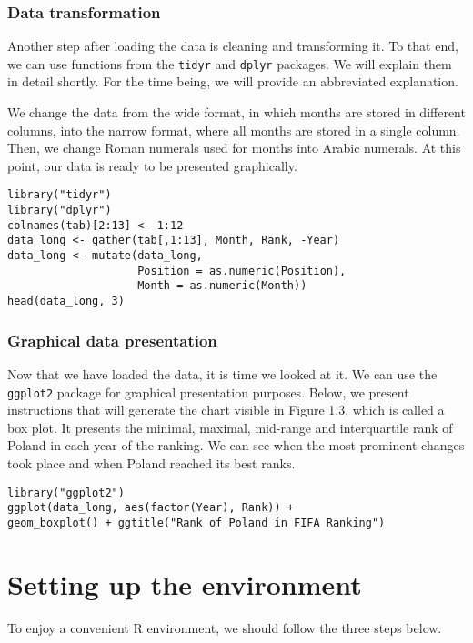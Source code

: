 \documentclass[]{book}
\theoremstyle{definition}
\theoremstyle{definition}
\theoremstyle{definition}
\theoremstyle{remark}
\begin{document}
\subsubsection{Data transformation}\label{part_1212}

Another step after loading the data is cleaning and transforming it. To
that end, we can use functions from the \texttt{tidyr} and
\texttt{dplyr} packages. We will explain them in detail shortly. For the
time being, we will provide an abbreviated explanation.

We change the data from the wide format, in which months are stored in
different columns, into the narrow format, where all months are stored
in a single column. Then, we change Roman numerals used for months into
Arabic numerals. At this point, our data is ready to be presented
graphically.

\begin{verbatim}
library("tidyr")
library("dplyr")
colnames(tab)[2:13] <- 1:12
data_long <- gather(tab[,1:13], Month, Rank, -Year)
data_long <- mutate(data_long,
                    Position = as.numeric(Position),
                    Month = as.numeric(Month))
head(data_long, 3)
\end{verbatim}

\subsubsection{Graphical data presentation}\label{part_1213}

Now that we have loaded the data, it is time we looked at it. We can use
the \texttt{ggplot2} package for graphical presentation purposes. Below,
we present instructions that will generate the chart visible in Figure
1.3, which is called a box plot. It presents the minimal, maximal,
mid-range and interquartile rank of Poland in each year of the ranking.
We can see when the most prominent changes took place and when Poland
reached its best ranks.

\begin{verbatim}
library("ggplot2")
ggplot(data_long, aes(factor(Year), Rank)) +
geom_boxplot() + ggtitle("Rank of Poland in FIFA Ranking")
\end{verbatim}

\section{Setting up the environment}\label{part_13}

To enjoy a convenient R environment, we should follow the three steps
below.
\end{document}
